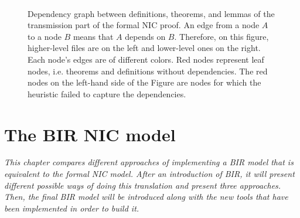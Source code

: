 \documentclass{kththesis}
\begin{document}
{\begin{figure}[p]
	\includegraphics[width=\textwidth]{figures/depgraph-nic-tx-thms.pdf}
	\centering
	\caption{Dependency graph between definitions, theorems, and lemmas of the transmission part of the formal NIC proof. An edge from a node $A$ to a node $B$ means that $A$ depends on $B$. Therefore, on this figure, higher-level files are on the left and lower-level ones on the right. Each node's edges are of different colors. Red nodes represent leaf nodes, i.e. theorems and definitions without dependencies. The red nodes on the left-hand side of the Figure are nodes for which the heuristic failed to capture the dependencies.}
	\label{depgraph-nic-tx-thms}
\end{figure}

\chapter{The BIR NIC model} \label{nic-model}
\vspace{-1cm}
\textit{This chapter compares different approaches of implementing a BIR model that is equivalent to the formal NIC model. After an introduction of BIR, it will present different possible ways of doing this translation and present three approaches. Then, the final BIR model will be introduced along with the new tools that have been implemented in order to build it.}

}
\end{document}

